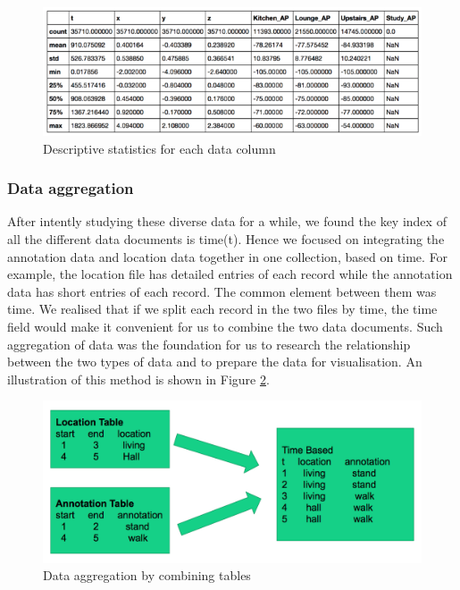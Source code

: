 \documentclass[fleqn,10pt]{SelfArx} %
\begin{document}
\begin{figure}[!h] \centering
	\includegraphics[scale=0.6]{desc-stats} 
	\caption{Descriptive statistics for each data column}
	\label{fig:md-stats}
\end{figure}

\subsubsection{Data aggregation}
After intently studying these diverse data for a while, we found the key index of all the different data documents is time(t). Hence we focused on integrating the annotation data and location data together in one collection, based on time. For example, the location file has detailed entries of each record while the annotation data has short entries of each record. The common element between them was time. We realised that if we split each record in the two files by time, the time field would make it convenient for us to combine the two data documents. Such aggregation of data was the foundation for us to research the relationship between the two types of data and to prepare the data for visualisation. An illustration of this method is shown in Figure \ref{fig:data-agg}. \\

\begin{figure}[!h] \centering
	\includegraphics[scale=0.2]{data-agg1} 
	\caption{Data aggregation by combining tables}
	\label{fig:data-agg}
\end{figure}
\end{document}
